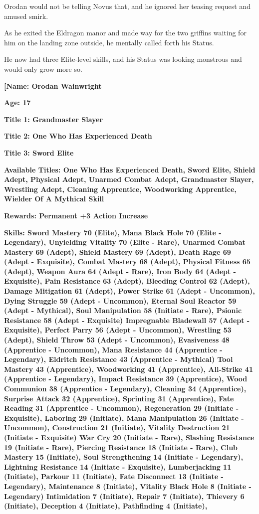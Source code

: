 \documentclass[a4paper,10pt]{book}
\begin{document}
Orodan would not be telling Novus that, and he ignored her teasing request and amused smirk.\par
As he exited the Eldragon manor and made way for the two griffins waiting for him on the landing zone outside, he mentally called forth his Status.\par
He now had three Elite-level skills, and his Status was looking monstrous and would only grow more so.\par
\textbf{[Name: Orodan Wainwright}\par
\textbf{Age: 17}\par
\textbf{Title 1: Grandmaster Slayer}\par
\textbf{Title 2: One Who Has Experienced Death}\par
\textbf{Title 3: Sword Elite}\par
\textbf{Available Titles: One Who Has Experienced Death, Sword Elite, Shield Adept, Physical Adept, Unarmed Combat Adept, Grandmaster Slayer, Wrestling Adept, Cleaning Apprentice, Woodworking Apprentice, Wielder Of A Mythical Skill}\par
\textbf{Rewards: Permanent +3 Action Increase}\par
\textbf{Skills: Sword Mastery 70 (Elite), Mana Black Hole 70 (Elite - Legendary), Unyielding Vitality 70 (Elite - Rare), Unarmed Combat Mastery 69 (Adept), Shield Mastery 69 (Adept), Death Rage 69 (Adept - Exquisite), Combat Mastery 68 (Adept), Physical Fitness 65 (Adept), Weapon Aura 64 (Adept - Rare), Iron Body 64 (Adept - Exquisite), Pain Resistance 63 (Adept), Bleeding Control 62 (Adept), Damage Mitigation 61 (Adept), Power Strike 61 (Adept - Uncommon), Dying Struggle 59 (Adept - Uncommon), Eternal Soul Reactor 59 (Adept - Mythical), Soul Manipulation 58 (Initiate - Rare), Psionic Resistance 58 (Adept - Exquisite) Impregnable Bladewall 57 (Adept - Exquisite), Perfect Parry 56 (Adept - Uncommon), Wrestling 53 (Adept), Shield Throw 53 (Adept - Uncommon), Evasiveness 48 (Apprentice - Uncommon), Mana Resistance 44 (Apprentice - Legendary), Eldritch Resistance 43 (Apprentice - Mythical) Tool Mastery 43 (Apprentice), Woodworking 41 (Apprentice), All-Strike 41 (Apprentice - Legendary), Impact Resistance 39 (Apprentice), Wood Communion 38 (Apprentice - Legendary), Cleaning 34 (Apprentice), Surprise Attack 32 (Apprentice), Sprinting 31 (Apprentice), Fate Reading 31 (Apprentice - Uncommon), Regeneration 29 (Initiate - Exquisite), Laboring 29 (Initiate), Mana Manipulation 26 (Initiate - Uncommon), Construction 21 (Initiate), Vitality Destruction 21 (Initiate - Exquisite) War Cry 20 (Initiate - Rare), Slashing Resistance 19 (Initiate - Rare), Piercing Resistance 18 (Initiate - Rare), Club Mastery 15 (Initiate), Soul Strengthening 14 (Initiate - Legendary), Lightning Resistance 14 (Initiate - Exquisite), Lumberjacking 11 (Initiate), Parkour 11 (Initiate), Fate Disconnect 13 (Initiate - Legendary), Maintenance 8 (Initiate), Vitality Black Hole 8 (Initiate - Legendary) Intimidation 7 (Initiate), Repair 7 (Initiate), Thievery 6 (Initiate), Deception 4 (Initiate), Pathfinding 4 (Initiate),}\par
\end{document}
